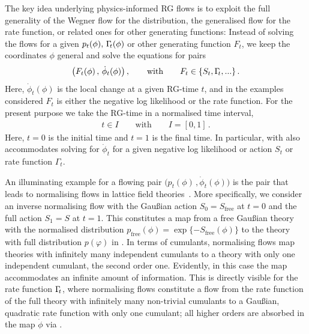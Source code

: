 \documentclass[reprint,amsmath,amssymb,aps,pra,superscriptaddress,nofootinbib,twocolumn,floatfix,nolongbibliography]{revtex4-2}
\begin{document}
The key idea underlying physics-informed RG flows \cite{Ihssen:2024ihp} is to exploit the full generality of the Wegner flow  for the distribution, the generalised flow  for the rate function, or related ones for other generating functions: Instead of solving the flows for a given $p_t(\phi), \, \Gamma_{\hspace{-.07cm}t}(\phi)$ or other generating function $F_t$, we keep the coordinates $\phi$ general and solve the equations for pairs 
%
\begin{align}
	\bigl(F_t(\phi)\,,\,\dot\phi_t(\phi)\bigr)\,,\qquad \textrm{with}\qquad F_t\in\{S_t,\Gamma_{\hspace{-.07cm}t},...\}\,. 
	\label{eq:PIRG-Pair}
\end{align}
%
Here, $\dot\phi_t(\phi)$ is the local change at a given RG-time $t$, and in the examples considered $F_t$ is either the negative log likelihood or the rate function. For the present purpose we take the RG-time in a normalised time interval,  
%
\begin{align}
t \in I\qquad \textrm{with}\qquad 	I=[0,1]\,.
	\label{eq:INormalised}
\end{align}
%
Here, $t=0$ is the initial time and $t=1$ is the final time. 
In particular,  with  also accommodates solving  for $\dot\phi_t$ for a given negative log likelihood or action $S_t$ or rate function $\Gamma_t$. 

An illuminating example for a flowing pair $\bigl(p_t(\phi)\,,\dot\phi_t(\phi)\bigr)$ is the pair that leads to 
normalising flows in lattice field theories~\cite{Luscher:2009eq, Rezende:2016vin, Albergo:2019eim, Nicoli:2020njz}. More specifically, we consider an inverse normalising flow with the Gau\ss ian action $S_0=S_\textrm{free}$ at $t=0$ and the full action $S_1=S$ at $t=1$. 
This constitutes a map from a free Gau\ss ian theory with the normalised distribution $p_\textrm{free}(\phi)= \exp\{-S_\textrm{free}(\phi)\}$ to the theory with full distribution $p(\varphi)$ in . In terms of cumulants, normalising flows map theories with infinitely many independent cumulants to a theory with only one independent cumulant, the second order one. Evidently, in this case the map accommodates an infinite amount of information. This is directly visible for the rate function $\Gamma_{\hspace{-.07cm}t}$, where normalising flows constitute a flow from the rate function of the full theory with infinitely many non-trivial cumulants to a Gau\ss ian, quadratic rate function with only one cumulant; all higher orders are absorbed in the map $\dot\phi$ via . 
\end{document}
